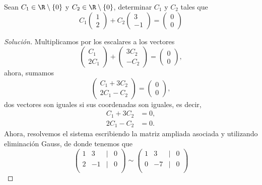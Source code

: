 \documentclass[a4,11pt]{aleph-notas}
\begin{document}
\begin{ejer}
    Sean $C_1 \in \R \setminus \{ 0 \}$ y $C_2 \in \R \setminus \{ 0 \}$, determinar $C_1$ y $C_2$ tales que
    \[
    C_1 \begin{pmatrix} 1 \\ 2 \end{pmatrix} + C_2 \begin{pmatrix} 3 \\ -1 \end{pmatrix} = \begin{pmatrix} 0 \\ 0 \end{pmatrix}
    \]
\end{ejer}

\begin{proof}[Solución]\hspace{0pt}
    Multiplicamos por los escalares a los vectores
    \[
    \begin{pmatrix} C_1 \\ 2C_1 \end{pmatrix} + \begin{pmatrix} 3C_2 \\ -C_2 \end{pmatrix} = \begin{pmatrix} 0 \\ 0 \end{pmatrix},
    \]
    ahora, sumamos
    \[
    \begin{pmatrix} C_1 + 3C_2 \\ 2C_1 - C_2 \end{pmatrix}  = \begin{pmatrix} 0 \\ 0 \end{pmatrix},
    \]
    dos vectores son iguales si sus coordenadas son iguales, es decir,
    \begin{align*}
        C_1+3C_2&=0,\\
        2C_1- C_2&=0.
    \end{align*}
    Ahora, resolvemos el sistema escribiendo la matriz ampliada asociada y utilizando eliminación Gauss, de donde tenemos que
    \[
    \begin{pmatrix}
    1 & 3 & | & 0 \\ 2 & -1 & | & 0 \\
    \end{pmatrix}
    \sim
    \begin{pmatrix}
    1 & 3 & | & 0 \\ 0 & -7 & | & 0 \\

\end{pmatrix}\]
\end{proof}
\end{document}
